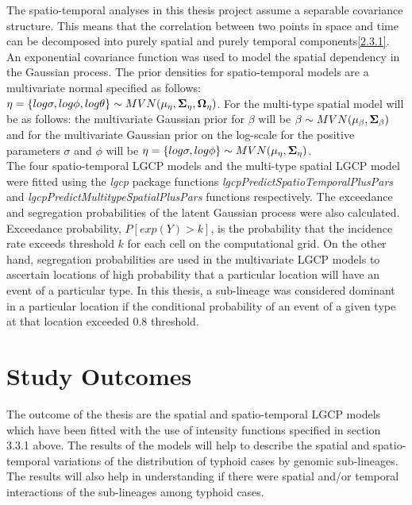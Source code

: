 \documentclass[12pt,a4paper]{report}
\begin{document}
The spatio-temporal analyses in this thesis project assume a separable covariance structure. This means that the correlation between two points in space and time can be decomposed into purely spatial and purely temporal components\ref{2.3.1}.\cite{Davies2013} An exponential covariance function was used to model the spatial dependency in the Gaussian process. The prior densities for spatio-temporal models are a multivariate normal  specified as follows: $\eta = \left\lbrace log \sigma,log \phi, log \theta \right\rbrace  \sim MVN(\bf\mu_{\eta},\bf\Sigma_{\eta}, \bf\Omega_{\eta})$. For the multi-type spatial model will be as follows: the multivariate Gaussian prior for $\beta$ will be $\beta \sim MVN(\bf\mu_{\beta},\bf\Sigma_{\beta})$ and for the multivariate Gaussian prior on the log-scale for the positive parameters $\sigma$ and $\phi$ will be $\eta = \left\lbrace log \sigma,log \phi \right\rbrace  \sim MVN(\bf\mu_{\eta},\bf\Sigma_{\eta})$.\cite{Taylor2013}\\

The four spatio-temporal LGCP models and the multi-type spatial LGCP model were fitted using the \textit{lgcp} package functions \textit{lgcpPredictSpatioTemporalPlusPars} and \textit{lgcpPredictMultitypeSpatialPlusPars} functions respectively. The exceedance and segregation probabilities of the latent Gaussian process were also calculated. Exceedance probability, $P[exp(Y)>k]$, is the probability that the incidence rate exceeds threshold $k$ for each cell on the computational grid. On the other hand, segregation probabilities are used in the multivariate LGCP models to ascertain locations of high probability that a particular location will have an event of a particular type. In this thesis, a sub-lineage was considered dominant in a particular location if the conditional probability of an event of a given type at that location exceeded 0.8 threshold. \cite{Taylor2015}

\section{Study Outcomes}

The outcome of the thesis are the spatial and spatio-temporal LGCP models which have been fitted with the use of intensity functions specified in section 3.3.1 above. The results of the models will help to describe the spatial and spatio-temporal variations of the distribution of typhoid cases by genomic sub-lineages. The results will also help in understanding if there were spatial and/or temporal interactions of the sub-lineages among typhoid cases.
\end{document}
